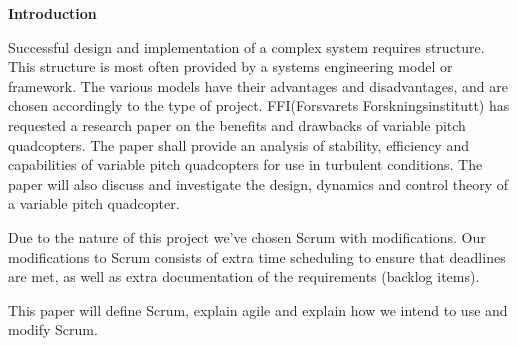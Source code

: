 \textbf{\LARGE Introduction} \bigskip

Successful design and implementation of a complex system requires structure. This structure is most often provided by a systems engineering model or framework. The various models have their advantages and disadvantages, and are chosen accordingly to the type of project. FFI(Forsvarets Forskningsinstitutt) has requested a research paper on the benefits and drawbacks of variable pitch quadcopters. The paper shall provide an analysis of stability, efficiency and capabilities of variable pitch quadcopters for use in turbulent conditions. The paper will also discuss and investigate the design, dynamics and control theory of a variable pitch quadcopter. \bigskip

Due to the nature of this project we've chosen Scrum with modifications. Our modifications to Scrum consists of extra time scheduling to ensure that deadlines are met, as well as extra documentation of the requirements (backlog items). \bigskip

This paper will define Scrum, explain agile and explain how we intend to use and modify Scrum.




